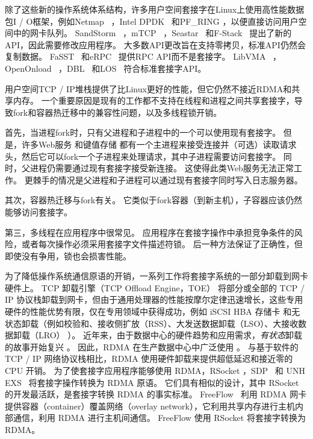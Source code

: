 除了这些新的操作系统体系结构，许多用户空间套接字在Linux上使用高性能数据包I / O框架，例如Netmap~ \cite {rizzo2012netmap}，Intel DPDK~ \cite {dpdk}和PF\_RING \cite {pf-ring}，以便直接访问用户空间中的网卡队列。
SandStorm~ \cite {marinos2014network}，mTCP~ \cite {jeong2014mtcp}，Seastar~ \cite {seastar}和F-Stack~ \cite {fstack}提出了新的API，因此需要修改应用程序。
大多数API更改旨在支持零拷贝，标准API仍然会复制数据。
FaSST~ \cite {kalia2016fasst}和eRPC~ \cite {kalia2018datacenter}提供RPC API而不是套接字。
LibVMA~ \cite {libvma}，OpenOnload~ \cite {openonload}，DBL~ \cite {dbl}和LOS~ \cite {huang2017high}符合标准套接字API。

用户空间TCP / IP堆栈提供了比Linux更好的性能，但它仍然不接近RDMA和共享内存。
一个重要原因是现有的工作都不支持在线程和进程之间共享套接字，导致fork和容器热迁移中的兼容性问题，以及多线程锁开销。

首先，当进程fork时，只有父进程和子进程中的一个可以使用现有套接字。
但是，许多Web服务 \cite {apache,nginx,php-fpm,python-gunicorn,vsftpd}和键值存储 \cite {memcached}都有一个主进程来接受连接并（可选）读取请求头，然后它可以fork一个子进程来处理请求，其中子进程需要访问套接字。
同时，父进程仍需要通过现有套接字接受新连接。
这使得此类Web服务无法正常工作。
更棘手的情况是父进程和子进程可以通过现有套接字同时写入日志服务器。

其次，容器热迁移与fork有关。
它类似于fork容器（到新主机），子容器应该仍然能够访问套接字。

第三，多线程在应用程序中很常见。
应用程序在套接字操作中承担竞争条件的风险，或者每次操作必须采用套接字文件描述符锁。
后一种方法保证了正确性，但即使没有争用，锁也会损害性能。

为了降低操作系统通信原语的开销，一系列工作将套接字系统的一部分卸载到网卡硬件上。
TCP 卸载引擎（TCP Offload Engine，TOE） \cite {tcp-chimney-offload} 将部分或全部的 TCP / IP 协议栈卸载到网卡，但由于通用处理器的性能按摩尔定律迅速增长，这些专用硬件的性能优势有限，仅在专用领域中获得成功，例如 iSCSI HBA 存储卡 \cite {iscsi-hba} 和无状态卸载（例如校验和、接收侧扩放（RSS）、大发送数据卸载（LSO）、大接收数据卸载（LRO） \cite {lsolro}）。
近年来，由于数据中心的硬件趋势和应用需求，\emph {有状态}卸载的故事开始复兴 \cite {chuanxiong-rdma-keynote}。
因此，RDMA \cite {infiniband2000infiniband} 在生产数据中心中广泛使用 \cite {guo2016rdma}。
与基于软件的 TCP / IP 网络协议栈相比，RDMA 使用硬件卸载来提供超低延迟和接近零的 CPU 开销。
为了使套接字应用程序能够使用 RDMA，RSocket \cite {rsockets}，SDP~ \cite {socketsdirect} 和 UNH EXS~ \cite {russell2008extended} 将套接字操作转换为 RDMA 原语。
它们具有相似的设计，其中 RSocket 的开发最活跃，是套接字转换 RDMA 的事实标准。
FreeFlow~ \cite {nsdi19freeflow} 利用 RDMA 网卡提供容器（container）覆盖网络（overlay network），它利用共享内存进行主机内部通信，利用 RDMA 进行主机间通信。
FreeFlow 使用 RSocket 将套接字转换为 RDMA。

